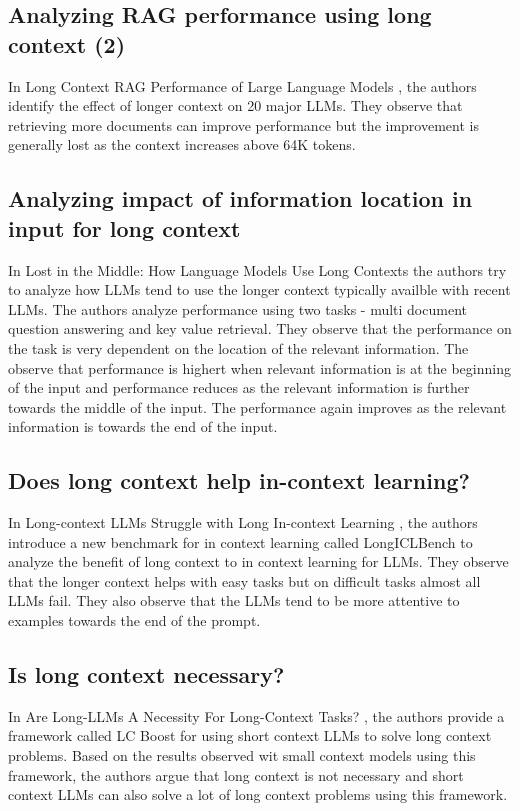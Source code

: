 \documentclass[twocolumn,11pt]{article}
\begin{document}
\subsection{Analyzing RAG performance using long context (2)}
In Long Context RAG Performance of Large Language Models \cite{leng2024longcontextragperformance}, the authors identify the effect of longer context on 20 major LLMs. They observe that retrieving more documents can improve performance but the improvement is generally lost as the context increases above 64K tokens.

\subsection{Analyzing impact of information location in input for long context}
In Lost in the Middle: How Language Models Use Long Contexts \cite{liu2023lostmiddlelanguagemodels} the authors try to analyze how LLMs tend to use the longer context typically availble with recent LLMs. The authors analyze performance using two tasks - multi document question answering and key value retrieval. They observe that the performance on the task is very dependent on the location of the relevant information. The observe that performance is highert when relevant information is at the beginning of the input and performance reduces as the relevant information is further towards the middle of the input. The performance again improves as the relevant information is towards the end of the input.

\subsection{Does long context help in-context learning?}
In Long-context LLMs Struggle with Long In-context Learning \cite{li2024longcontextllmsstrugglelong}, the authors introduce a new benchmark for in context learning called LongICLBench to analyze the benefit of long context to in context learning for LLMs. They observe that the longer context helps with easy tasks but on difficult tasks almost all LLMs fail. They also observe that the LLMs tend to be more attentive to examples towards the end of the prompt.

\subsection{Is long context necessary?}
In Are Long-LLMs A Necessity For Long-Context Tasks? \cite{qian2024longllmsnecessitylongcontexttasks}, the authors provide a framework called LC Boost for using short context LLMs to solve long context problems. Based on the results observed wit small context models using this framework, the authors argue that long context is not necessary and short context LLMs can also solve a lot of long context problems using this framework.
\end{document}
